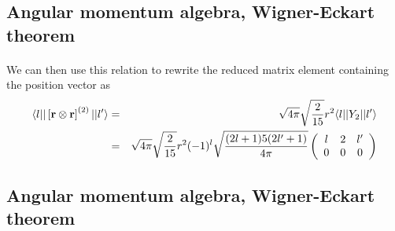 \documentclass[%
twoside,                 %
final,                   %
10pt]{article}
\begin{document}
\subsection*{Angular momentum algebra, Wigner-Eckart theorem}

\paragraph{}
We can then  use this relation to rewrite the reduced matrix element containing the 
position vector as  
\begin{eqnarray*}
\langle l \vert\vert\left[{\bf r} \otimes {\bf r} \right]^{(2)} \vert \vert l'\rangle
& = & 
\sqrt{4\pi}\sqrt{ \frac{2}{15}}r^2 \langle l \vert\vert Y_2 \vert \vert l'\rangle \\
& = &\sqrt{4\pi}\sqrt{ \frac{2}{15}}  r^2 (-1)^l
\sqrt{\frac{(2l+1)5(2l'+1)}{4\pi}}
\left(\begin{array}{ccc} l&2&l' \\ 0&0&0\end{array}\right)
\end{eqnarray*}



\subsection*{Angular momentum algebra, Wigner-Eckart theorem}

\end{document}

